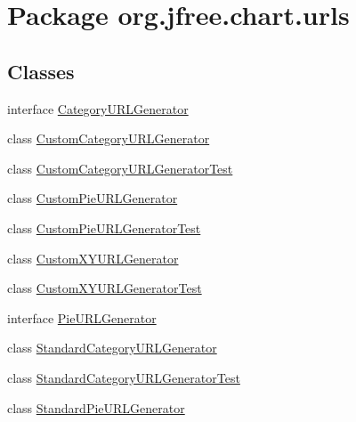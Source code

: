\hypertarget{namespaceorg_1_1jfree_1_1chart_1_1urls}{}\section{Package org.\+jfree.\+chart.\+urls}
\label{namespaceorg_1_1jfree_1_1chart_1_1urls}
\subsection*{Classes}
\begin{DoxyCompactItemize}
\item 
interface \mbox{\hyperlink{interfaceorg_1_1jfree_1_1chart_1_1urls_1_1_category_u_r_l_generator}{Category\+U\+R\+L\+Generator}}
\item 
class \mbox{\hyperlink{classorg_1_1jfree_1_1chart_1_1urls_1_1_custom_category_u_r_l_generator}{Custom\+Category\+U\+R\+L\+Generator}}
\item 
class \mbox{\hyperlink{classorg_1_1jfree_1_1chart_1_1urls_1_1_custom_category_u_r_l_generator_test}{Custom\+Category\+U\+R\+L\+Generator\+Test}}
\item 
class \mbox{\hyperlink{classorg_1_1jfree_1_1chart_1_1urls_1_1_custom_pie_u_r_l_generator}{Custom\+Pie\+U\+R\+L\+Generator}}
\item 
class \mbox{\hyperlink{classorg_1_1jfree_1_1chart_1_1urls_1_1_custom_pie_u_r_l_generator_test}{Custom\+Pie\+U\+R\+L\+Generator\+Test}}
\item 
class \mbox{\hyperlink{classorg_1_1jfree_1_1chart_1_1urls_1_1_custom_x_y_u_r_l_generator}{Custom\+X\+Y\+U\+R\+L\+Generator}}
\item 
class \mbox{\hyperlink{classorg_1_1jfree_1_1chart_1_1urls_1_1_custom_x_y_u_r_l_generator_test}{Custom\+X\+Y\+U\+R\+L\+Generator\+Test}}
\item 
interface \mbox{\hyperlink{interfaceorg_1_1jfree_1_1chart_1_1urls_1_1_pie_u_r_l_generator}{Pie\+U\+R\+L\+Generator}}
\item 
class \mbox{\hyperlink{classorg_1_1jfree_1_1chart_1_1urls_1_1_standard_category_u_r_l_generator}{Standard\+Category\+U\+R\+L\+Generator}}
\item 
class \mbox{\hyperlink{classorg_1_1jfree_1_1chart_1_1urls_1_1_standard_category_u_r_l_generator_test}{Standard\+Category\+U\+R\+L\+Generator\+Test}}
\item 
class \mbox{\hyperlink{classorg_1_1jfree_1_1chart_1_1urls_1_1_standard_pie_u_r_l_generator}{Standard\+Pie\+U\+R\+L\+Generator}}
\item 

\end{DoxyCompactItemize}
